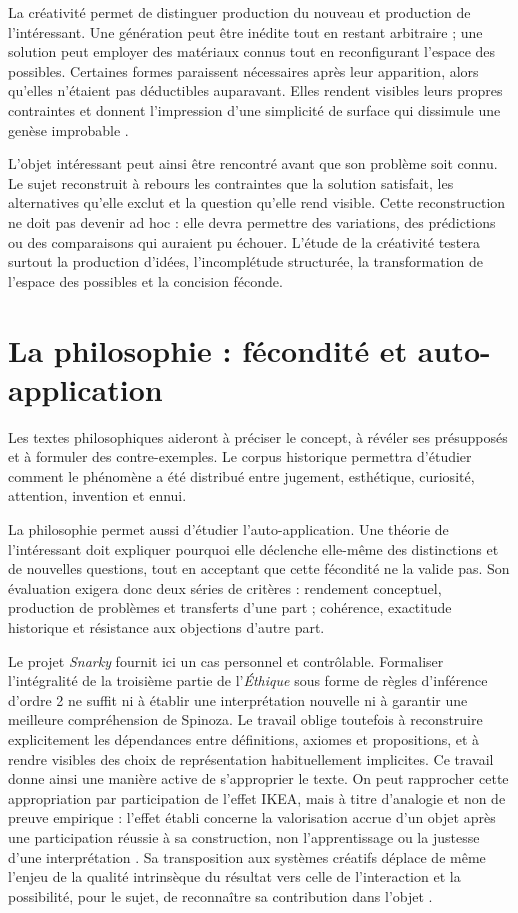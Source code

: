 \documentclass[11pt,a4paper]{article}
\begin{document}
La créativité permet de distinguer production du nouveau et production de
l'intéressant. Une génération peut être inédite tout en restant arbitraire ;
une solution peut employer des matériaux connus tout en reconfigurant l'espace
des possibles. Certaines formes paraissent nécessaires après leur apparition,
alors qu'elles n'étaient pas déductibles auparavant. Elles rendent visibles
leurs propres contraintes et donnent l'impression d'une simplicité de surface
qui dissimule une genèse improbable
\parencite{pachet2026impossibilite,pachet2027virtuosite}.

L'objet intéressant peut ainsi être rencontré avant que son problème soit
connu. Le sujet reconstruit à rebours les contraintes que la solution satisfait,
les alternatives qu'elle exclut et la question qu'elle rend visible. Cette
reconstruction ne doit pas devenir ad hoc : elle devra permettre des variations,
des prédictions ou des comparaisons qui auraient pu échouer. L'étude de la
créativité testera surtout la production d'idées, l'incomplétude structurée, la
transformation de l'espace des possibles et la concision féconde.

\section{La philosophie : fécondité et auto-application}

Les textes philosophiques aideront à préciser le concept, à révéler ses
présupposés et à formuler des contre-exemples. Le corpus historique permettra
d'étudier comment le phénomène a
été distribué entre jugement, esthétique, curiosité, attention, invention et
ennui.

La philosophie permet aussi d'étudier l'auto-application. Une théorie de
l'intéressant doit expliquer pourquoi elle déclenche elle-même des distinctions
et de nouvelles questions, tout en acceptant que cette fécondité ne la valide pas. Son
évaluation exigera donc deux séries de critères : rendement conceptuel,
production de problèmes et transferts d'une part ; cohérence, exactitude
historique et résistance aux objections d'autre part.

Le projet \emph{Snarky} fournit ici un cas personnel et contrôlable. Formaliser
l'intégralité de la troisième partie de l'\emph{Éthique} sous forme de règles
d'inférence d'ordre 2 ne suffit ni à établir une interprétation nouvelle ni à
garantir une meilleure compréhension de Spinoza. Le travail oblige toutefois à
reconstruire explicitement les dépendances entre définitions, axiomes et
propositions, et à rendre visibles des choix de représentation habituellement
implicites. Ce travail donne ainsi une manière active de s'approprier le texte.
On peut rapprocher cette appropriation par participation de l'effet IKEA,
mais à titre d'analogie et non de preuve empirique : l'effet établi concerne la
valorisation accrue d'un objet après une participation réussie à sa construction,
non l'apprentissage ou la justesse d'une interprétation
\parencite{norton2012ikea}. Sa transposition aux systèmes créatifs déplace de
même l'enjeu de la qualité intrinsèque du résultat vers celle de l'interaction et
la possibilité, pour le sujet, de reconnaître sa contribution dans l'objet
\parencite[152--153]{pachet2026generation}.
\end{document}
